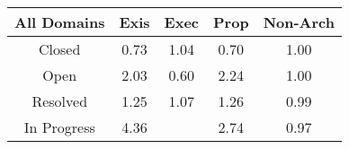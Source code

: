 \begin{tabular}{|c||c|c|c|c|}
\hline
All Domains & Exis & Exec & Prop & Non-Arch \\ 
\hline
Closed & \cellcolor[rgb]{0.8100417691311546,0.36686437388746496,0.32670565118907763} 0.73 & \cellcolor[rgb]{0.9058599708078788,0.8380389335405742,0.42} 1.04 & \cellcolor[rgb]{0.7999351997640165,0.31902661221634504,0.3172728531130822} 0.70 & \cellcolor[rgb]{0.9097994774946101,0.8399050156553416,0.42} 1.00 \\ 
\hline
Open & \cellcolor[rgb]{0.7931905358248607,0.7846692011801971,0.41999999999999993} 2.03 & \cellcolor[rgb]{0.76,0.13,0.28} 0.60 & \cellcolor[rgb]{0.76935391401436,0.7733781697962758,0.42} 2.24 & \cellcolor[rgb]{0.9095798560865855,0.8398009844620667,0.42} 1.00 \\ 
\hline
Resolved & \cellcolor[rgb]{0.8814572775324239,0.8264797630416745,0.42000000000000004} 1.25 & \cellcolor[rgb]{0.9025778137516453,0.8364842275665688,0.42} 1.07 & \cellcolor[rgb]{0.8802938981761363,0.8259286886097488,0.42} 1.26 & \cellcolor[rgb]{0.9078556681109025,0.8298501623916049,0.4179986235701756} 0.99 \\ 
\hline
In Progress & \cellcolor[rgb]{0.53,0.66,0.42} 4.36 &  & \cellcolor[rgb]{0.712717402426962,0.7465503485180347,0.42} 2.74 & \cellcolor[rgb]{0.8976034239047517,0.781322873149158,0.40842986231110157} 0.97 \\ 
\hline
\end{tabular}